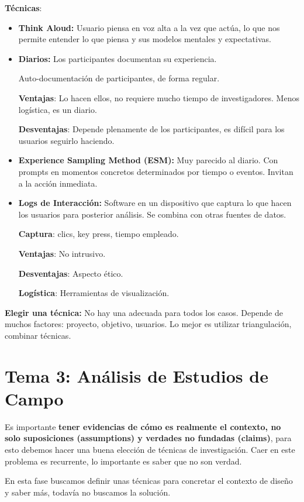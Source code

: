 \documentclass[12pt, twoside, openright]{report} %
\begin{document}
\textbf{Técnicas}:
\begin{itemize}
	\item \textbf{Think Aloud:} Usuario piensa en voz alta a la vez que
	      actúa, lo que nos permite entender lo que piensa y sus modelos mentales
	      y expectativas.
	\item \textbf{Diarios:} Los participantes documentan su experiencia.

	      Auto-documentación de participantes, de forma regular.

	      \textbf{Ventajas}: Lo hacen ellos, no requiere mucho tiempo
	      de investigadores. Menos logística, es un diario.

	      \textbf{Desventajas}: Depende plenamente de los
	      participantes, es difícil para los usuarios seguirlo haciendo.
	\item \textbf{Experience Sampling Method (ESM):} Muy parecido al
	      diario. Con prompts en momentos concretos determinados por tiempo o
	      eventos. Invitan a la acción inmediata.
	\item \textbf{Logs de Interacción:} Software en un dispositivo
	      que captura lo que hacen los usuarios para posterior análisis.     Se combina con otras fuentes de datos.


	      \textbf{Captura}: clics, key press, tiempo empleado.

	      \textbf{Ventajas}: No intrusivo.

	      \textbf{Desventajas}: Aspecto ético.

	      \textbf{Logística}: Herramientas de visualización.
\end{itemize}

\textbf{Elegir una técnica:} No hay una adecuada para todos los casos.
Depende de muchos factores: proyecto, objetivo, usuarios. Lo mejor es utilizar triangulación, combinar técnicas.

\chapter{Tema 3: Análisis de Estudios de
  Campo}

Es importante \textbf{tener evidencias de cómo es realmente el contexto,
	no solo suposiciones (assumptions) y verdades no fundadas (claims)},
para esto debemos hacer una buena elección de técnicas de investigación.
Caer en este problema es recurrente, lo importante es saber que no son
verdad.

En esta fase buscamos definir unas técnicas para concretar el contexto
de diseño y saber más, todavía no buscamos la solución.
\end{document}
